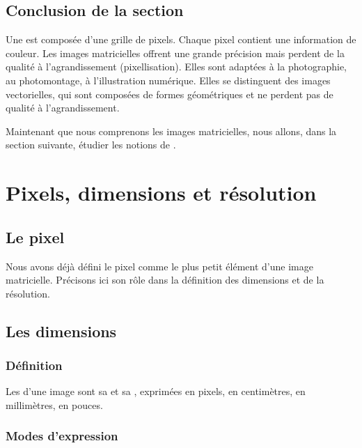 \subsection*{Conclusion de la section}

Une  est composée d'une grille de pixels. Chaque pixel contient une information de couleur. Les images matricielles offrent une grande précision mais perdent de la qualité à l'agrandissement (pixellisation). Elles sont adaptées à la photographie, au photomontage, à l'illustration numérique. Elles se distinguent des images vectorielles, qui sont composées de formes géométriques et ne perdent pas de qualité à l'agrandissement.

Maintenant que nous comprenons les images matricielles, nous allons, dans la section suivante, étudier les notions de .

\section{Pixels, dimensions et résolution}

\subsection{Le pixel}

Nous avons déjà défini le pixel comme le plus petit élément d'une image matricielle. Précisons ici son rôle dans la définition des dimensions et de la résolution.

\subsection{Les dimensions}

\subsubsection{Définition}

Les  d'une image sont sa  et sa , exprimées en pixels, en centimètres, en millimètres, en pouces.

\subsubsection{Modes d'expression}

